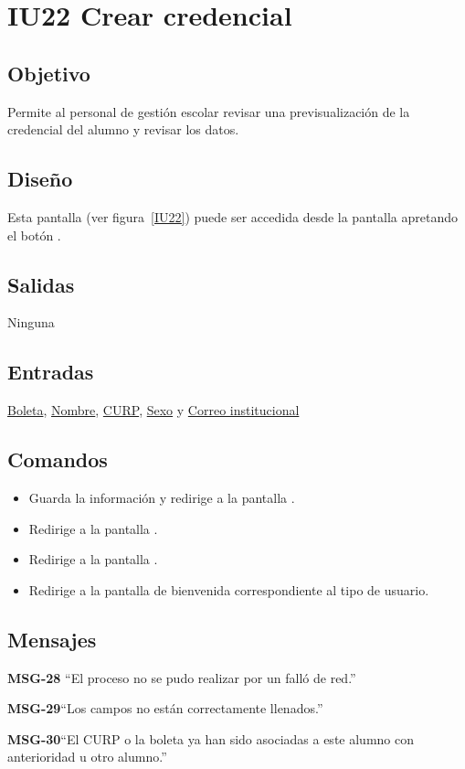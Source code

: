 
\section{IU22 Crear credencial}

\subsection{Objetivo}
   Permite al personal de gestión escolar revisar una previsualización de la credencial del alumno y revisar los datos.
\subsection{Diseño}
    Esta pantalla  (ver figura~\ref{IU22}) puede ser accedida desde la pantalla  apretando el botón .


\subsection{Salidas}
Ninguna
\subsection{Entradas}
    \hyperlink{Alumno.Boleta}{Boleta}, \hyperlink{Alumno.Nombre}{Nombre}, \hyperlink{Alumno.CURP}{CURP}, \hyperlink{Alumno.Sexo}{Sexo} y \hyperlink{Alumno.Correo institucional}{Correo institucional}
\subsection{Comandos}
\begin{itemize}
\item {} Guarda la información y redirige a la pantalla .
    \item {} Redirige a la pantalla .
    \item {} Redirige a la pantalla .
    \item {} Redirige a la pantalla de bienvenida correspondiente al tipo de usuario.
    
\end{itemize}

\subsection{Mensajes}

\begin{Citemize}
    \item {\bf MSG-28}  ``El proceso no se pudo realizar por un falló de red.''
    \item {\bf MSG-29}{``Los campos no están correctamente llenados.''}
    \item {\bf MSG-30}{``El CURP o la boleta ya han sido asociadas a este alumno con anterioridad u otro alumno.''}
\end{Citemize}
